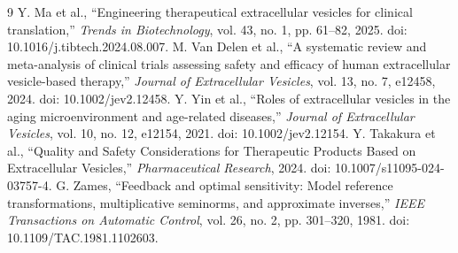 \documentclass[11pt]{article}
\begin{document}
\begin{thebibliography}{9}\small
{} Y. Ma et al., ``Engineering therapeutical extracellular vesicles for clinical translation,'' \emph{Trends in Biotechnology}, vol. 43, no. 1, pp. 61--82, 2025. doi: 10.1016/j.tibtech.2024.08.007.
 M. Van Delen et al., ``A systematic review and meta-analysis of clinical trials assessing safety and efficacy of human extracellular vesicle-based therapy,'' \emph{Journal of Extracellular Vesicles}, vol. 13, no. 7, e12458, 2024. doi: 10.1002/jev2.12458.
 Y. Yin et al., ``Roles of extracellular vesicles in the aging microenvironment and age-related diseases,'' \emph{Journal of Extracellular Vesicles}, vol. 10, no. 12, e12154, 2021. doi: 10.1002/jev2.12154.
 Y. Takakura et al., ``Quality and Safety Considerations for Therapeutic Products Based on Extracellular Vesicles,'' \emph{Pharmaceutical Research}, 2024. doi: 10.1007/s11095-024-03757-4.
 G. Zames, ``Feedback and optimal sensitivity: Model reference transformations, multiplicative seminorms, and approximate inverses,'' \emph{IEEE Transactions on Automatic Control}, vol. 26, no. 2, pp. 301--320, 1981. doi: 10.1109/TAC.1981.1102603.
\end{thebibliography}
\end{document}
